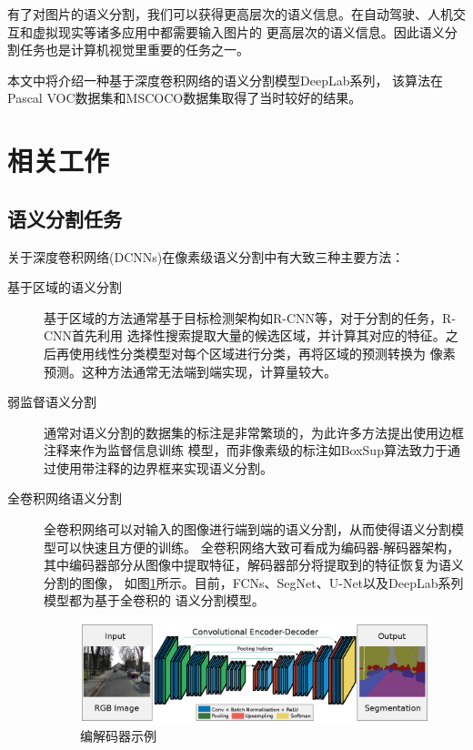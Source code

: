 \documentclass[10pt, a4paper]{article}
\begin{document}
有了对图片的语义分割，我们可以获得更高层次的语义信息。在自动驾驶、人机交互和虚拟现实等诸多应用中都需要输入图片的
更高层次的语义信息。因此语义分割任务也是计算机视觉里重要的任务之一。

本文中将介绍一种基于深度卷积网络的语义分割模型DeepLab\cite{Deeplab1,Deeplab2,Deeplab3}系列，
该算法在Pascal VOC数据集\cite{VOC}和MSCOCO数据集\cite{COCO}取得了当时较好的结果。

\section{相关工作}
\subsection{语义分割任务}
关于深度卷积网络(DCNNs)在像素级语义分割中有大致三种主要方法：

\begin{description}
    \item[基于区域的语义分割] 基于区域的方法通常基于目标检测架构如R-CNN\cite{RCNN}等，对于分割的任务，R-CNN首先利用
    选择性搜索提取大量的候选区域，并计算其对应的特征。之后再使用线性分类模型对每个区域进行分类，再将区域的预测转换为
    像素预测。这种方法通常无法端到端实现，计算量较大。
    \item[弱监督语义分割] 通常对语义分割的数据集的标注是非常繁琐的，为此许多方法提出使用边框注释来作为监督信息训练
    模型，而非像素级的标注如BoxSup\cite{BoxSup}算法致力于通过使用带注释的边界框来实现语义分割。
    \item[全卷积网络语义分割] 全卷积网络可以对输入的图像进行端到端的语义分割，从而使得语义分割模型可以快速且方便的训练。
    全卷积网络大致可看成为编码器-解码器架构，其中编码器部分从图像中提取特征，解码器部分将提取到的特征恢复为语义分割的图像，
    如图\ref{p1}所示。目前，FCNs\cite{FCN}、SegNet\cite{SegNet}、U-Net\cite{UNet}以及DeepLab系列模型都为基于全卷积的
    语义分割模型。

    \begin{figure}[h]
        \centering
        \includegraphics[width=\textwidth]{p1.eps}
        \caption{编解码器示例\cite{SegNet}}
        \label{p1}
    \end{figure}
\end{description}
\end{document}
